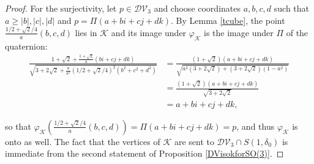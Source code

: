 \documentclass[11pt,twoside]{amsart}
\theoremstyle{plain}
\begin{document}
\begin{proof}
For the surjectivity, let $p\in\mathcal{DV}_3$ and choose coordinates $a,b,c,d$ such that $a\ge|b|,|c|,|d|$ and $p=\Pi(a+bi+cj+dk)$. By Lemma \ref{tcube}, the point $\frac{1/2+\sqrt{2}/4}{a}(b,c,d)$ lies in $\mathcal{K}$ and its image under $\varphi_{\mathcal{K}}$ is the image under $\Pi$ of the quaternion:
\begin{align*}
\frac{1+\sqrt{2}+\frac{1+\sqrt{2}}{a}(bi+cj+dk)}{\sqrt{3+2\sqrt{2}+\tfrac{8}{a^2}(1/2+\sqrt{2}/4)^2(b^2+c^2+d^2)}}&=\frac{(1+\sqrt{2})(a+bi+cj+dk)}{\sqrt{a^2(3+2\sqrt{2})+(3+2\sqrt{2})(1-a^2)}} \\
&=\frac{(1+\sqrt{2})(a+bi+cj+dk)}{\sqrt{3+2\sqrt{2}}} \\
&=a+bi+cj+dk,
\end{align*}%

so that $\varphi_{\mathcal{K}}\left(\tfrac{1/2+\sqrt{2}/4}{a}(b,c,d)\right)=\Pi(a+bi+cj+dk)=p$, and thus $\varphi_{\mathcal{K}}$ is onto as well. The fact that the vertices of $\mathcal{K}$ are sent to $\mathcal{DV}_3\cap S(1,\delta_0)$ is immediate from the second statement of Proposition \ref{DVisokforSO(3)}.
\end{proof}
\end{document}
